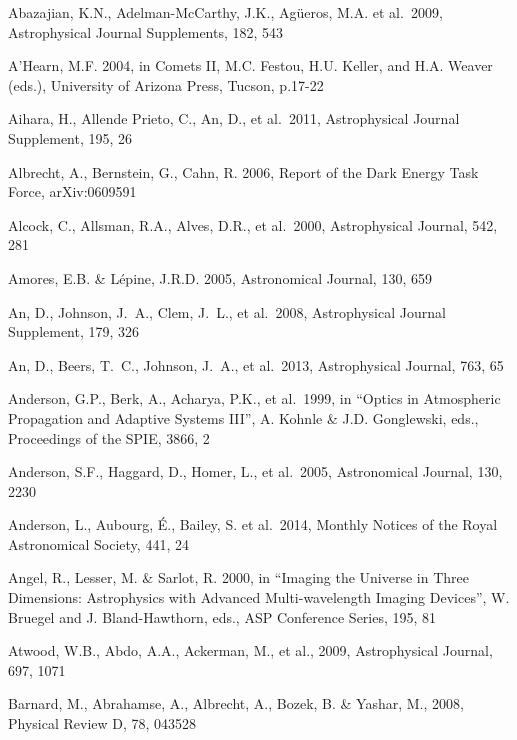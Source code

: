\documentclass{emulateapj}
\begin{document}
\vskip 0.3in
\begin{thebibliography}{}

\bibitem[()]{} Abazajian, K.N., Adelman-McCarthy, J.K., Ag\"ueros,
  M.A. et al.~2009, Astrophysical Journal Supplements, 182, 543

\bibitem[()]{} A'Hearn, M.F. 2004, in Comets II, M.C. Festou, H.U. Keller, and H.A. Weaver (eds.), 
             University of  Arizona Press, Tucson, p.17-22 

\bibitem[()]{} Aihara, H., Allende Prieto, C., An, D., et al.~2011,
  Astrophysical Journal Supplement, 195, 26


\bibitem[()]{} Albrecht, A., Bernstein, G., Cahn, R. 2006, Report of
  the Dark Energy Task Force, arXiv:0609591

\bibitem[()]{} Alcock, C., Allsman, R.A., Alves, D.R., et al.~2000, Astrophysical Journal, 542, 281  

\bibitem[()]{} Amores, E.B. \& L\'{e}pine, J.R.D. 2005, Astronomical Journal, 130, 659

\bibitem[()]{} An, D., Johnson, J.~A., Clem, J.~L., et al.~2008, Astrophysical Journal Supplement, 179, 326

\bibitem[()]{} An, D., Beers, T.~C., Johnson, J.~A., et al.~2013, Astrophysical Journal, 763, 65

\bibitem[()]{} Anderson, G.P., Berk, A., Acharya, P.K., et al.~1999, in ``Optics in
             Atmospheric Propagation and Adaptive Systems III'',  A. Kohnle \& J.D. Gonglewski,
             eds., Proceedings of the SPIE, 3866, 2

\bibitem[()]{} Anderson, S.F., Haggard, D., Homer, L., et al.~2005, Astronomical Journal, 130, 2230

\bibitem[()]{} Anderson, L., Aubourg, \'E., Bailey, S. et al.~2014,
  Monthly Notices of the Royal Astronomical Society, 441, 24

\bibitem[()]{} Angel, R., Lesser, M. \& Sarlot, R. 2000, in  ``Imaging the Universe in Three 
             Dimensions: Astrophysics with Advanced Multi-wavelength Imaging Devices'',
             W. Bruegel and J. Bland-Hawthorn, eds., ASP Conference Series, 195, 81

\bibitem[()]{} Atwood, W.B., Abdo, A.A., Ackerman, M., et al., 2009, Astrophysical Journal, 697, 1071

\bibitem[()]{} Barnard, M., Abrahamse, A., Albrecht, A., Bozek, B. \& Yashar, M., 2008, Physical Review D, 78, 043528


\end{thebibliography}
\end{document}

